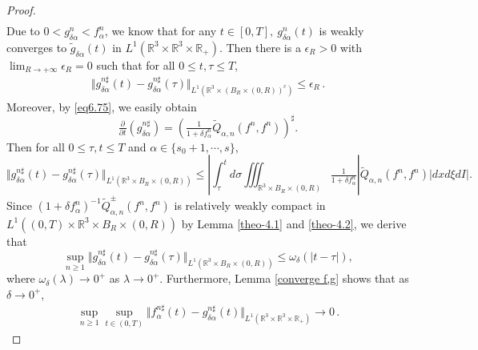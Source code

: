 \documentclass[reqno,11pt]{amsart}
\numberwithin{equation}{section}
\def\R{\mathbb{R}}
\begin{document}
\begin{proof}
\begin{equation*}
\begin{aligned}
		\end{aligned}
	\end{equation*}
Due to $0 < g^n_{\delta \alpha} < f^n_\alpha$, we know that for any $t \in [0,T],\ g^n_{\delta \alpha} (t)$ is weakly converges to $\tilde{g}_{\delta \alpha} (t)$ in $L^1(\R^3 \times \R^3 \times \R_+)$. Then there is a $\epsilon_R > 0$ with $\lim_{R \to + \infty} \epsilon_R = 0$ such that for all $0 \leq t, \tau \leq T$,
\begin{equation*}
  \begin{aligned}
    \Vert g^{n\sharp }_{\delta \alpha } (t)- g^{n\sharp }_{\delta \alpha } (\tau) \Vert_{L^1(\R^3 \times ( B_R \times (0, R) )^c )} \leq \epsilon_R \,.
  \end{aligned}
\end{equation*}
Moreover, by \eqref{eq6.75}, we easily obtain
	\begin{equation*}
		\tfrac{\partial }{\partial t} (g^{n\sharp}_{\delta \alpha}) = (\tfrac{1}{1+\delta f^n_\alpha }\tilde{Q}_{\alpha ,n} (f^n,f^n))^{\sharp}.
	\end{equation*}
	Then for all $0\leq \tau,  t\leq T$ and $\alpha \in \{s_0+1,\cdots,s\}$,
	\begin{equation*}
		\Vert g^{n\sharp }_{\delta \alpha } (t)- g^{n\sharp }_{\delta \alpha } (\tau) \Vert_{L^1(\R^3 \times B_R \times (0,R))} \leq | \int_{\tau}^{t}d\sigma \iiint_{ \R^3 \times B_R \times (0,R)} \tfrac{1}{1+\delta f^n_\alpha } |\tilde{Q}_{\alpha ,n} (f^n,f^n)|dxd\xi dI |.
	\end{equation*}
	Since $(1+\delta f^n_\alpha)^{-1}  \tilde{Q}^\pm_{\alpha ,n} (f^n,f^n)$ is relatively weakly compact in $L^1((0,T)\times \R^3\times B_R \times (0,R))$ by Lemma \ref{theo-4.1} and \ref{theo-4.2}, we derive that
	\begin{equation*}
	\sup \limits_{n\geq 1}	\Vert g^{n\sharp }_{\delta \alpha } (t)- g^{n\sharp }_{\delta \alpha } (\tau) \Vert_{L^1(\R^3 \times B_R \times (0,R))} \leq \omega_\delta(|t-\tau|),
	\end{equation*}
where $\omega_\delta(\lambda) \rightarrow 0^+$ as $\lambda \rightarrow 0^+$. Furthermore, Lemma \ref{converge f,g} shows that as $\delta \to 0^+$,
\begin{equation*}
  \begin{aligned}
    \sup_{n \geq 1} \sup \limits_{t\in (0,T)} \Vert f^{n\sharp }_\alpha (t)- g^{n\sharp }_{\delta \alpha } (t) \Vert_{L^1(\R^3 \times \R^3 \times \R_+)} \to 0 \,.
  \end{aligned}
\end{equation*}

\end{proof}
\end{document}
